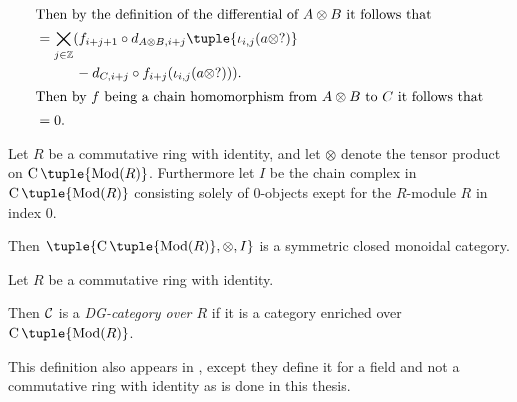 \begin{remark}
\begin{align*}
        \intertext{Then by the definition of the differential of \( A \otimes B \) it follows that}
        &= \bigtimes_{j \in \Zb} ( f_{i + j + 1} \circ d_{A \otimes B, i + j} \tuple{\iota_{i, j}(a \otimes ?)} \\
        &\hspace{1cm} - d_{C, i + j} \circ f_{i + j} ( \iota_{i, j} (a \otimes ?) ) ). \\
        \intertext{Then by \( f \) being a chain homomorphism from \( A \otimes B \) to \( C \) it follows that}
        &= 0.
    \end{align*}
\end{remark}

\begin{fact}
    Let \( R \) be a commutative ring with identity, and let \( \otimes \) denote the tensor product on \( \C \tuple{\Mod(R)} \). Furthermore let \( I \) be the chain complex in \( \C \tuple{\Mod(R)} \) consisting solely of \( 0 \)-objects exept for the \( R \)-module \( R \) in index \( 0 \).

    Then \( \tuple{\C \tuple{\Mod(R)}, \otimes, I} \) is a symmetric closed monoidal category.
\end{fact}

\begin{definition}[DG-category]
    Let \( R \) be a commutative ring with identity.

    Then \( {\mathcal{C}} \) is a \emph{DG-category over \( R \)} if it is a category enriched over \( \C \tuple{\Mod(R)} \).
\end{definition}
This definition also appears in \cite[p. 29]{Jasso-Muro_2023}, except they define it for a field and not a commutative ring with identity as is done in this thesis.

